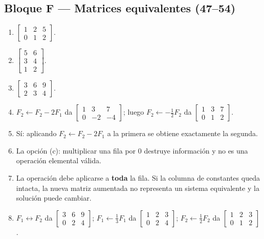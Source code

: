 \documentclass[12pt, letterpaper]{article}
\newcommand{\mwmat}[1]{\ensuremath{\begin{bmatrix}#1\end{bmatrix}}}
\begin{document}
\subsection*{Bloque F — Matrices equivalentes (47--54)}
\begin{enumerate}[label=\textbf{\arabic*.}, start=47, leftmargin=*]
  \item $\mwmat{1&2&5\\0&1&2}$.
  \item $\mwmat{5&6\\3&4\\1&2}$.
  \item $\mwmat{3&6&9\\2&3&4}$.
  \item $F_2\leftarrow F_2-2F_1$ da $\mwmat{1&3&7\\0&-2&-4}$; luego
        $F_2\leftarrow-\tfrac12F_2$ da $\mwmat{1&3&7\\0&1&2}$.
  \item Sí: aplicando $F_2\leftarrow F_2-2F_1$ a la primera se obtiene
        exactamente la segunda.
  \item La opción (c): multiplicar una fila por $0$ destruye información y
        no es una operación elemental válida.
  \item La operación debe aplicarse a \textbf{toda} la fila. Si la columna
        de constantes queda intacta, la nueva matriz aumentada no representa
        un sistema equivalente y la solución puede cambiar.
  \item $F_1\leftrightarrow F_2$ da $\mwmat{3&6&9\\0&2&4}$;
        $F_1\leftarrow\tfrac13F_1$ da $\mwmat{1&2&3\\0&2&4}$;
        $F_2\leftarrow\tfrac12F_2$ da $\mwmat{1&2&3\\0&1&2}$.
\end{enumerate}
\end{document}
